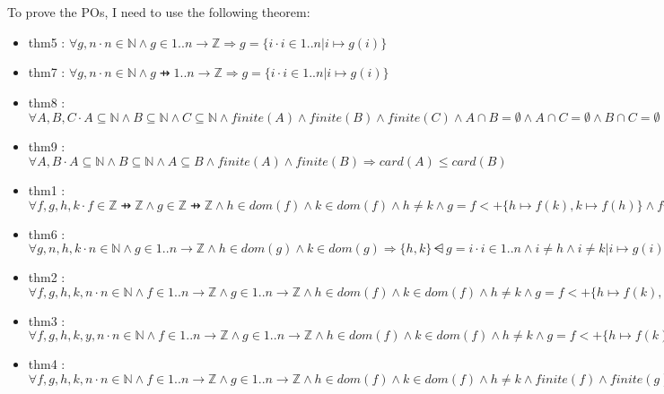 To prove the POs, I need to use the following theorem: 
\begin{itemize}
\item thm5 : $\forall g,n \cdot n \in \mathbb{N} \land g \in 1..n \to \mathbb{Z} \Rightarrow g=\{i \cdot i \in 1..n | i \mapsto g(i)\}$
\item thm7 : $\forall g,n \cdot n \in \mathbb{N} \land g \pfun 1..n \to \mathbb{Z} \Rightarrow g= \{i \cdot i \in 1..n | i \mapsto g(i)\}$
\item thm8 : $\forall A,B,C \cdot A \subseteq \mathbb{N} \land B \subseteq \mathbb{N} \land C \subseteq \mathbb{N} \land finite(A) \land finite(B) \land finite(C) \land A \cap B = \emptyset \land A \cap C = \emptyset \land B \cap C = \emptyset \Rightarrow card(A \cup B \cup C) = card(A) + card(B) + card(C)$

\item thm9 : $\forall A,B \cdot A \subseteq \mathbb{N} \land B \subseteq \mathbb{N} \land A \subseteq B \land finite(A) \land finite(B)  \Rightarrow card(A) \leq card(B)$

\item thm1 : $\forall f,g,h,k \cdot f \in \mathbb{Z} \pfun \mathbb{Z} \land g \in \mathbb{Z} \pfun \mathbb{Z} \land h \in dom(f) \land k \in dom(f) \land h \neq k \land g = f <+ \{h \mapsto f(k), k \mapsto f(h)\} \land finite(f) \land finite(g) \Rightarrow dom(g) = dom(f)$

\item thm6 : $\forall g,n,h,k \cdot n \in \mathbb{N} \land g \in 1..n \to \mathbb{Z} \land h \in dom(g) \land k \in dom(g) \Rightarrow \{h,k\} \dsub g = {i \cdot i \in 1..n \land i \neq h \land i \neq k | i \mapsto g(i)}$

\item thm2 : $\forall f,g,h,k,n \cdot n \in \mathbb{N} \land f \in 1..n \to \mathbb{Z} \land g \in 1..n \to \mathbb{Z} \land h \in dom(f) \land k \in dom(f) \land h \neq k \land g = f <+ \{h \mapsto f(k), k \mapsto f(h)\} \land finite(f) \land finite(g) \Rightarrow ran(g) = ran(f)$

\item thm3 : $\forall f,g,h,k,y,n \cdot n\in \mathbb{N} \land f \in 1..n \to \mathbb{Z} \land g \in 1..n \to \mathbb{Z} \land h \in dom(f) \land k \in dom(f) \land h \neq k \land g = f<+\{h \mapsto f(k), k \mapsto f(h) \} \land finite(f) \land finite(g) \land y \in ran(f) \Rightarrow card(\{u \cdot u \in dom(f) \land u \mapsto y \in f | u \}) =  card(\{x \cdot x \in dom(g) \land x \mapsto y \in g | x \})$

\item thm4 : $\forall f,g,h,k,n \cdot n \in \mathbb{N} \land f \in 1..n \to \mathbb{Z} \land g \in 1..n \to \mathbb{Z} \land h \in dom(f) \land k \in dom(f) \land h \neq k \land finite(f) \land finite(g) \land (\forall i \cdot i \in 1..n \land i \neq h \land i \neq k \Rightarrow g(i)=f(i)) \land g(h)=f(k) \land g(k)=f(h) \Rightarrow g = f<+\{h \mapsto f(k), k \mapsto f(h)\}$
\end{itemize}

